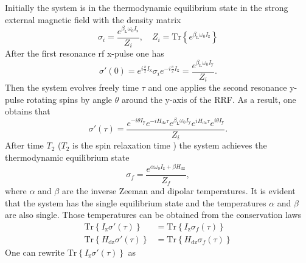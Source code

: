 \documentclass[review]{elsarticle}
\begin{document}
Initially the system is in the thermodynamic equilibrium state in the strong external magnetic field with the density matrix
%
\begin{equation}
    \label{eq:a1}
   \sigma_{i} = \dfrac{e^{\beta_\mathrm{L} \omega_{0} I_\mathrm{z}}}{Z_{i}} ,
   \quad
   Z_{i} = \mathrm{Tr}\left\{e^{\beta_\mathrm{L} \omega_{0} I_\mathrm{z}} \right\}
\end{equation}
%
After the first resonance rf x-pulse one has
%
\begin{equation}
    \label{eq:a2}
    \sigma'(0) = e^{ i \frac \pi 2 I_\mathrm{x}}
    \sigma_{i}
    e^{-i \frac \pi 2 I_\mathrm{x}}
    = \dfrac{e^{\beta_\mathrm{L} \omega_{0} I_\mathrm{y}}}{Z_{i}}  .
\end{equation}
%
Then the system evolves freely time $\tau$ 
and one applies the second resonance y-pulse rotating spins by angle $\theta$ around the y-axis of the RRF.
As a result, one obtains that
\begin{equation}
    \label{eq:a3}
    \sigma'(\tau) 
    = \dfrac{
      e^{-i \theta I_\mathrm{y}} e^{-i H_\mathrm{dz} \tau} 
      e^{\beta_\mathrm{L} \omega_{0} I_\mathrm{y}}
      e^{i H_\mathrm{dz} \tau} e^{i \theta I_\mathrm{y}}
    }{Z_{i}}. 
\end{equation}
%
After time $T_2$ ($T_2$ is the spin relaxation time \cite{Goldman_1970}) the system achieves the thermodynamic equilibrium state
\begin{equation}
    \label{eq:a4}
    \sigma_{f} 
    = \dfrac{ e^{\alpha \omega_{0} I_\mathrm{z} + \beta H_\mathrm{dz}} }{Z_f},
\end{equation}
%
where $\alpha$ and $\beta$ are the inverse Zeeman and dipolar temperatures.
It is evident that the system has the single equilibrium state 
and the temperatures $\alpha$ and $\beta$ are also single.
Those temperatures can be obtained from the conservation laws
\begin{align}
    \label{eq:a5}
    \mathrm{Tr} \left\{ I_\mathrm{z} \sigma'(\tau) \right\}
    & = \mathrm{Tr} \left\{ I_\mathrm{z} \sigma_{f}(\tau) \right\}
    \\
    \label{eq:a6}
    \mathrm{Tr} \left\{ H_\mathrm{dz} \sigma'(\tau) \right\}
    & = \mathrm{Tr} \left\{ H_\mathrm{dz} \sigma_{f}(\tau) \right\}
\end{align}
%
One can rewrite $\mathrm{Tr} \left\{ I_\mathrm{z} \sigma'(\tau) \right\}$ as 
%
\end{document}
